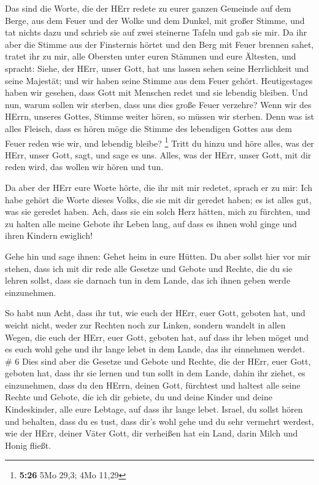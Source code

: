  Das sind die Worte, die der HErr redete zu eurer ganzen
Gemeinde auf dem Berge, aus dem Feuer und der Wolke und dem Dunkel, mit
großer Stimme, und tat nichts dazu und schrieb sie auf zwei steinerne
Tafeln und gab sie mir.  Da ihr aber die Stimme aus der
Finsternis hörtet und den Berg mit Feuer brennen sahet, tratet ihr zu
mir, alle Obersten unter euren Stämmen und eure Ältesten, 
und spracht: Siehe, der HErr, unser Gott, hat uns lassen sehen seine
Herrlichkeit und seine Majestät; und wir haben seine Stimme aus dem
Feuer gehört. Heutigestages haben wir gesehen, dass Gott mit Menschen
redet und sie lebendig bleiben.  Und nun, warum sollen wir
sterben, dass uns dies große Feuer verzehre? Wenn wir des HErrn, unseres
Gottes, Stimme weiter hören, so müssen wir sterben.  Denn
was ist alles Fleisch, dass es hören möge die Stimme des lebendigen
Gottes aus dem Feuer reden wie wir, und lebendig bleibe? \footnote{\textbf{5:26}
  5Mo 29,3; 4Mo 11,29}  Tritt du hinzu und höre alles, was
der HErr, unser Gott, sagt, und sage es uns. Alles, was der HErr, unser
Gott, mit dir reden wird, das wollen wir hören und tun.

 Da aber der HErr eure Worte hörte, die ihr mit mir
redetet, sprach er zu mir: Ich habe gehört die Worte dieses Volks, die
sie mit dir geredet haben; es ist alles gut, was sie geredet haben.
 Ach, dass sie ein solch Herz hätten, mich zu fürchten, und
zu halten alle meine Gebote ihr Leben lang, auf dass es ihnen wohl ginge
und ihren Kindern ewiglich!

 Gehe hin und sage ihnen: Gehet heim in eure Hütten.
 Du aber sollst hier vor mir stehen, dass ich mit dir rede
alle Gesetze und Gebote und Rechte, die du sie lehren sollst, dass sie
darnach tun in dem Lande, das ich ihnen geben werde einzunehmen.

 So habt nun Acht, dass ihr tut, wie euch der HErr, euer
Gott, geboten hat, und weicht nicht, weder zur Rechten noch zur Linken,
 sondern wandelt in allen Wegen, die euch der HErr, euer
Gott, geboten hat, auf dass ihr leben möget und es euch wohl gehe und
ihr lange lebet in dem Lande, das ihr einnehmen werdet. \# 6
 Dies sind aber die Gesetze und Gebote und Rechte, die der
HErr, euer Gott, geboten hat, dass ihr sie lernen und tun sollt in dem
Lande, dahin ihr ziehet, es einzunehmen,  dass du den HErrn,
deinen Gott, fürchtest und haltest alle seine Rechte und Gebote, die ich
dir gebiete, du und deine Kinder und deine Kindeskinder, alle eure
Lebtage, auf dass ihr lange lebet.  Israel, du sollst hören
und behalten, dass du es tust, dass dir's wohl gehe und du sehr vermehrt
werdest, wie der HErr, deiner Väter Gott, dir verheißen hat ein Land,
darin Milch und Honig fließt.

